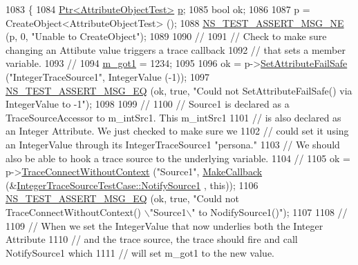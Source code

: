 \begin{DoxyCode}
1083 \{
1084   \hyperlink{classns3_1_1Ptr}{Ptr<AttributeObjectTest>} \hyperlink{lte__link__budget_8m_ac9de518908a968428863f829398a4e62}{p};
1085   \textcolor{keywordtype}{bool} ok;
1086 
1087   p = CreateObject<AttributeObjectTest> ();
1088   \hyperlink{group__testing_ga73d66fb0050a5111453fd144e767b91a}{NS\_TEST\_ASSERT\_MSG\_NE} (p, 0, \textcolor{stringliteral}{"Unable to CreateObject"});
1089 
1090   \textcolor{comment}{//}
1091   \textcolor{comment}{// Check to make sure changing an Attibute value triggers a trace callback}
1092   \textcolor{comment}{// that sets a member variable.}
1093   \textcolor{comment}{//}
1094   \hyperlink{classIntegerTraceSourceTestCase_a191fafb3fcaa0c793101de8af0ff6ada}{m\_got1} = 1234;
1095 
1096   ok = p->\hyperlink{classns3_1_1ObjectBase_aa7d333004e970f925a4ed5df275541b5}{SetAttributeFailSafe} (\textcolor{stringliteral}{"IntegerTraceSource1"}, IntegerValue (-1));
1097   \hyperlink{group__testing_ga2a9d78cffb3db8e867c35fff0b698cf5}{NS\_TEST\_ASSERT\_MSG\_EQ} (ok, \textcolor{keyword}{true}, \textcolor{stringliteral}{"Could not SetAttributeFailSafe() via IntegerValue
       to -1"});
1098 
1099   \textcolor{comment}{//}
1100   \textcolor{comment}{// Source1 is declared as a TraceSourceAccessor to m\_intSrc1.  This m\_intSrc1}
1101   \textcolor{comment}{// is also declared as an Integer Attribute.  We just checked to make sure we}
1102   \textcolor{comment}{// could set it using an IntegerValue through its IntegerTraceSource1 "persona."}
1103   \textcolor{comment}{// We should also be able to hook a trace source to the underlying variable.}
1104   \textcolor{comment}{//}
1105   ok = p->\hyperlink{classns3_1_1ObjectBase_a1be45f6fd561e75dcac9dfa81b2b81e4}{TraceConnectWithoutContext} (\textcolor{stringliteral}{"Source1"}, 
      \hyperlink{group__makecallbackmemptr_ga9376283685aa99d204048d6a4b7610a4}{MakeCallback} (&\hyperlink{classIntegerTraceSourceTestCase_af8fe2912cc7dd753132471139207a62b}{IntegerTraceSourceTestCase::NotifySource1}
      , \textcolor{keyword}{this}));
1106   \hyperlink{group__testing_ga2a9d78cffb3db8e867c35fff0b698cf5}{NS\_TEST\_ASSERT\_MSG\_EQ} (ok, \textcolor{keyword}{true}, \textcolor{stringliteral}{"Could not TraceConnectWithoutContext() \(\backslash\)"Source1\(\backslash\)"
       to NodifySource1()"});
1107 
1108   \textcolor{comment}{//}
1109   \textcolor{comment}{// When we set the IntegerValue that now underlies both the Integer Attribute}
1110   \textcolor{comment}{// and the trace source, the trace should fire and call NotifySource1 which}
1111   \textcolor{comment}{// will set m\_got1 to the new value.}

\end{DoxyCode}
